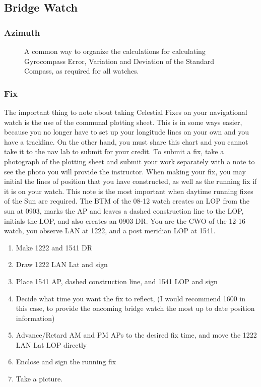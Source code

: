 \documentclass[letterpaper,12pt]{article}
\begin{document}
\subsection{Bridge Watch}
\subsubsection{Azimuth} \label{doubleget}
\begin{figure}[htpb]
	\centering
	
	\caption{A common way to organize the calculations for calculating Gyrocompass Error, Variation and Deviation of the Standard Compass, as required for all watches.}
	\label{fig:getget}
\end{figure}
\subsubsection{Fix}
The important thing to note about taking Celestial Fixes on your navigational watch is the use of the communal plotting sheet.
This is in some ways easier, because you no longer have to set up your longitude lines on your own and you have a trackline.
On the other hand, you must share this chart and you cannot take it to the nav lab to submit for your credit.
To submit a fix, take a photograph of the plotting sheet and submit your work separately with a note to see the photo you will provide the instructor.
When making your fix, you may initial the lines of position that you have constructed, as well as the running fix if it is on your watch.
This note is the most important when daytime running fixes of the Sun are required.
The BTM of the 08-12 watch creates an LOP from the sun at 0903, marks the AP and leaves a dashed construction line to the LOP, initials the LOP, and also creates an 0903 DR.
You are the CWO of the 12-16 watch, you observe LAN at 1222, and a post meridian LOP \astrosun{} at 1541. 
\begin{enumerate}
	\item Make 1222 and 1541 DR
	\item Draw 1222 LAN Lat and sign
	\item Place 1541 AP, dashed construction line, and 1541 LOP and sign
	\item Decide what time you want the fix to reflect, (I would recommend 1600 in this case, to provide the oncoming bridge watch the most up to date position information)
	\item Advance/Retard AM and PM APs to the desired fix time, and move the 1222 LAN Lat LOP directly
	\item Enclose and sign the running fix
	\item Take a picture.
\end{enumerate}
\end{document}
